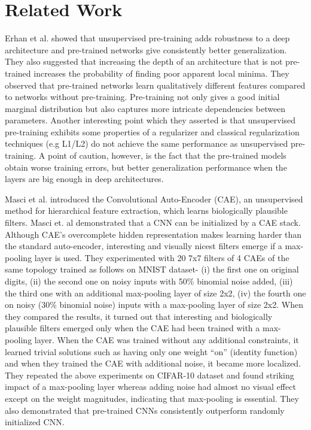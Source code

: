 \documentclass{article}
\begin{document}
\section{Related Work}
Erhan et al. \citep{Erhan10} showed that unsupervised pre-training adds robustness to a deep architecture and pre-trained networks give consistently better
generalization. They also suggested that increasing the depth of an architecture that is not pre-trained increases the probability of finding poor apparent local minima. They observed that pre-trained networks learn qualitatively different features compared to networks without pre-training. Pre-training not only gives a good initial
marginal distribution but also captures more intricate dependencies between parameters. Another interesting point which they asserted is that unsupervised pre-training exhibits some properties of a regularizer and classical regularization techniques (e.g L1/L2) do not achieve
the same performance as unsupervised pre-training. A point of caution, however, is the fact that the pre-trained models obtain worse training errors, but better generalization performance when the layers are big enough in deep architectures.

Masci et al. \citep{masci11} introduced the Convolutional Auto-Encoder (CAE), an unsupervised method for hierarchical feature extraction, which learns biologically plausible filters. Masci et. al demonstrated that a CNN can be initialized by a CAE stack. Although CAE’s overcomplete hidden representation makes learning harder than the standard auto-encoder,  interesting and visually nicest filters emerge if a max-pooling layer is used. They experimented with 20 7x7 filters of 4 CAEs of the same topology trained as follows on MNIST dataset- (i) the first one on original digits, (ii) the second one on noisy inputs with 50\% binomial noise added,
(iii) the third one with an additional max-pooling layer of size 2x2,
(iv) the fourth one on noisy (30\% binomial noise) inputs with a max-pooling layer of size 2x2.
When they compared the results, it turned out that interesting and biologically plausible filters emerged only when the CAE had been trained with a max-pooling layer. When the CAE was trained without any additional constraints, it learned trivial solutions such as having only one weight “on” (identity function) and when they trained the CAE with additional noise, it became more localized. They repeated the above experiments on CIFAR-10 dataset and found striking impact of a max-pooling layer whereas adding noise had almost no visual effect except on the weight magnitudes, indicating that max-pooling is essential. They also demonstrated that pre-trained CNNs consistently outperform randomly initialized CNN.
\end{document}
